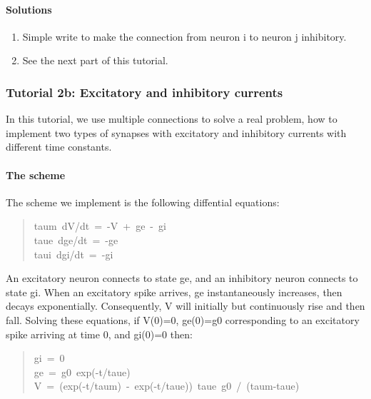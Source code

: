 \documentclass[letterpaper,10pt]{manual}
\begin{document}
\paragraph{Solutions}
\begin{enumerate}
\item {} 
Simple write  to make the connection from neuron
i to neuron j inhibitory.

\item {} 
See the next part of this tutorial.

\end{enumerate}

\resetcurrentobjects


\subsubsection{Tutorial 2b: Excitatory and inhibitory currents}

In this tutorial, we use multiple connections to solve a real problem, how
to implement two types of synapses with excitatory and inhibitory currents
with different time constants.


\paragraph{The scheme}

The scheme we implement is the following diffential equations:
\begin{quote}
{\raggedright{}taum~dV/dt~=~-V~+~ge~-~gi\\
taue~dge/dt~=~-ge\\
taui~dgi/dt~=~-gi}
\end{quote}

An excitatory neuron connects to state ge, and an inhibitory neuron connects
to state gi. When an excitatory spike arrives, ge instantaneously increases,
then decays exponentially. Consequently, V will initially but continuously
rise and then fall. Solving these equations, if V(0)=0, ge(0)=g0 corresponding
to an excitatory spike arriving at time 0, and gi(0)=0 then:
\begin{quote}
{\raggedright{}gi~=~0\\
ge~=~g0~exp(-t/taue)\\
V~=~(exp(-t/taum)~-~exp(-t/taue))~taue~g0~/~(taum-taue)}
\end{quote}
\end{document}
